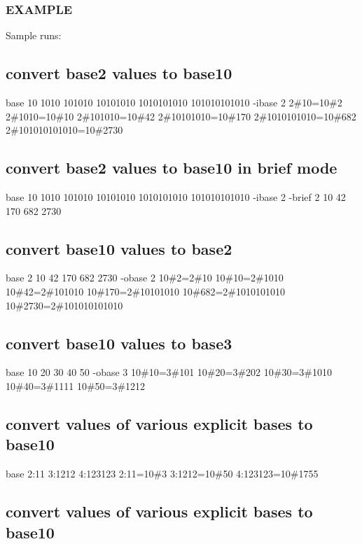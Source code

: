 \subsubsection*{E\+X\+A\+M\+P\+LE}

Sample runs\+:

\subsection*{convert base2 values to base10}

base 10 1010 101010 10101010 1010101010 101010101010 -\/ibase 2 2\#10=10\#2 2\#1010=10\#10 2\#101010=10\#42 2\#10101010=10\#170 2\#1010101010=10\#682 2\#101010101010=10\#2730

\subsection*{convert base2 values to base10 in brief mode}

base 10 1010 101010 10101010 1010101010 101010101010 -\/ibase 2 -\/brief 2 10 42 170 682 2730

\subsection*{convert base10 values to base2}

base 2 10 42 170 682 2730 -\/obase 2 10\#2=2\#10 10\#10=2\#1010 10\#42=2\#101010 10\#170=2\#10101010 10\#682=2\#1010101010 10\#2730=2\#101010101010

\subsection*{convert base10 values to base3}

base 10 20 30 40 50 -\/obase 3 10\#10=3\#101 10\#20=3\#202 10\#30=3\#1010 10\#40=3\#1111 10\#50=3\#1212

\subsection*{convert values of various explicit bases to base10}

base 2\+:11 3\+:1212 4\+:123123 2\+:11=10\#3 3\+:1212=10\#50 4\+:123123=10\#1755

\subsection*{convert values of various explicit bases to base10}

